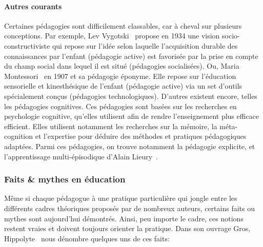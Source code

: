             \paragraph{Autres courants}
                Certaines pédagogies sont difficilement classables, car à cheval sur plusieurs conceptions. Par exemple, Lev Vygotski~ propose en 1934 une vision socio-constructiviste qui repose sur l'idée selon laquelle l'acquisition durable des connaissances par l'enfant (pédagogie active) est favorisée par la prise en compte du champ social dans lequel il est situé (pédagogies socialisées). Ou, 
                Maria Montessori~ en 1907 et sa pédagogie éponyme.
                Elle repose sur l'éducation sensorielle et kinesthésique de l'enfant (pédagogie active)  via un set d'outils spécialement conçus (pédagogies technologiques). 
                D'autres existent encore, telles les pédagogies cognitives. Ces pédagogies sont basées sur les recherches en psychologie cognitive, qu'elles utilisent afin de rendre l'enseignement plus efficace \etou efficient. Elles utilisent notamment les recherches sur la mémoire, la méta-cognition et l'expertise pour déduire des méthodes et pratiques pédagogiques adaptées. Parmi ces pédagogies, on trouve notamment la pédagogie explicite, et l'apprentissage multi-épisodique d'Alain Lieury~.
        \subsubsection{Faits \& mythes en éducation}
            Même si chaque pédagogue à une pratique particulière qui jongle entre les différents cadres théoriques proposés par de nombreux auteurs, certains faits ou mythes sont aujourd'hui démontrés. Ainsi, peu importe le cadre, ces notions restent vraies et doivent toujours orienter la pratique. Dans son ouvrage  Gros, Hippolyte~ nous dénombre quelques uns de ces faits:
